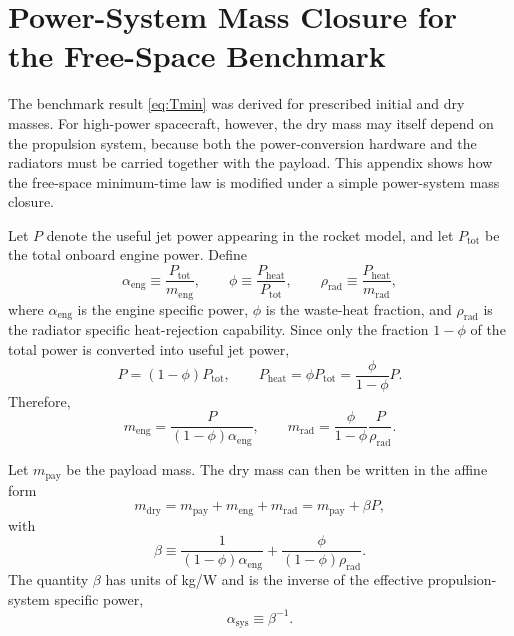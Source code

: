 \documentclass[journal, a4paper]{IEEEtran}
\begin{document}
\appendices
\section{Power-System Mass Closure for the Free-Space Benchmark}
\label{sec:appendix_mass_closure}

The benchmark result \eqref{eq:Tmin} was derived for prescribed initial and dry masses. 
For high-power spacecraft, however, the dry mass may itself depend on the propulsion system, because both the power-conversion hardware and the radiators must be carried together with the payload. 
This appendix shows how the free-space minimum-time law is modified under a simple power-system mass closure.

Let \(P\) denote the useful jet power appearing in the rocket model, and let \(P_\mathrm{tot}\) be the total onboard engine power. 
Define
\begin{equation}
  \alpha_\mathrm{eng} \equiv \frac{P_\mathrm{tot}}{m_\mathrm{eng}},
  \qquad
  \phi \equiv \frac{P_\mathrm{heat}}{P_\mathrm{tot}},
  \qquad
  \rho_\mathrm{rad} \equiv \frac{P_\mathrm{heat}}{m_\mathrm{rad}},
\end{equation}
where \(\alpha_\mathrm{eng}\) is the engine specific power, \(\phi\) is the waste-heat fraction, and \(\rho_\mathrm{rad}\) is the radiator specific heat-rejection capability. 
Since only the fraction \(1-\phi\) of the total power is converted into useful jet power,
\begin{equation}
  P = (1-\phi)P_\mathrm{tot},
  \qquad
  P_\mathrm{heat} = \phi P_\mathrm{tot}
  = \frac{\phi}{1-\phi}P.
\end{equation}
Therefore,
\begin{equation}
  m_\mathrm{eng}=\frac{P}{(1-\phi)\alpha_\mathrm{eng}},
  \qquad
  m_\mathrm{rad}=\frac{\phi}{1-\phi}\frac{P}{\rho_\mathrm{rad}}.
\end{equation}

Let \(m_\mathrm{pay}\) be the payload mass. 
The dry mass can then be written in the affine form
\begin{equation}
  m_\mathrm{dry}=m_\mathrm{pay}+m_\mathrm{eng}+m_\mathrm{rad}
  = m_\mathrm{pay}+\beta P,
  \label{eq:mdry_beta_app}
\end{equation}
with
\begin{equation}
  \beta \equiv
  \frac{1}{(1-\phi)\alpha_\mathrm{eng}}
  +\frac{\phi}{(1-\phi)\rho_\mathrm{rad}}.
  \label{eq:beta_def_app}
\end{equation}
The quantity \(\beta\) has units of kg/W and is the inverse of the effective propulsion-system specific power,
\begin{equation}
  \alpha_\mathrm{sys}\equiv \beta^{-1}.
\end{equation}
\end{document}
